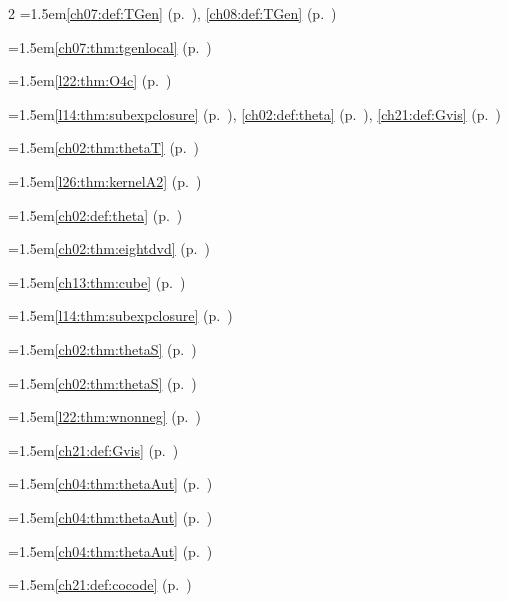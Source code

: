 \begin{multicols}{2}
\hangindent=1.5em\quad \ref{ch07:def:TGen} (p.~\pageref{ch07:def:TGen}), \ref{ch08:def:TGen} (p.~\pageref{ch08:def:TGen})\par
\hangindent=1.5em\quad \ref{ch07:thm:tgenlocal} (p.~\pageref{ch07:thm:tgenlocal})\par
\hangindent=1.5em\quad \ref{l22:thm:O4c} (p.~\pageref{l22:thm:O4c})\par
\hangindent=1.5em\quad \ref{l14:thm:subexpclosure} (p.~\pageref{l14:thm:subexpclosure}), \ref{ch02:def:theta} (p.~\pageref{ch02:def:theta}), \ref{ch21:def:Gvis} (p.~\pageref{ch21:def:Gvis})\par
\hangindent=1.5em\quad \ref{ch02:thm:thetaT} (p.~\pageref{ch02:thm:thetaT})\par
\hangindent=1.5em\quad \ref{l26:thm:kernelA2} (p.~\pageref{l26:thm:kernelA2})\par
\hangindent=1.5em\quad \ref{ch02:def:theta} (p.~\pageref{ch02:def:theta})\par
\hangindent=1.5em\quad \ref{ch02:thm:eightdvd} (p.~\pageref{ch02:thm:eightdvd})\par
\hangindent=1.5em\quad \ref{ch13:thm:cube} (p.~\pageref{ch13:thm:cube})\par
\hangindent=1.5em\quad \ref{l14:thm:subexpclosure} (p.~\pageref{l14:thm:subexpclosure})\par
\hangindent=1.5em\quad \ref{ch02:thm:thetaS} (p.~\pageref{ch02:thm:thetaS})\par
\hangindent=1.5em\quad \ref{ch02:thm:thetaS} (p.~\pageref{ch02:thm:thetaS})\par
\hangindent=1.5em\quad \ref{l22:thm:wnonneg} (p.~\pageref{l22:thm:wnonneg})\par
\hangindent=1.5em\quad \ref{ch21:def:Gvis} (p.~\pageref{ch21:def:Gvis})\par
\hangindent=1.5em\quad \ref{ch04:thm:thetaAut} (p.~\pageref{ch04:thm:thetaAut})\par
\hangindent=1.5em\quad \ref{ch04:thm:thetaAut} (p.~\pageref{ch04:thm:thetaAut})\par
\hangindent=1.5em\quad \ref{ch04:thm:thetaAut} (p.~\pageref{ch04:thm:thetaAut})\par
\hangindent=1.5em\quad \ref{ch21:def:cocode} (p.~\pageref{ch21:def:cocode})\par

\end{multicols}
